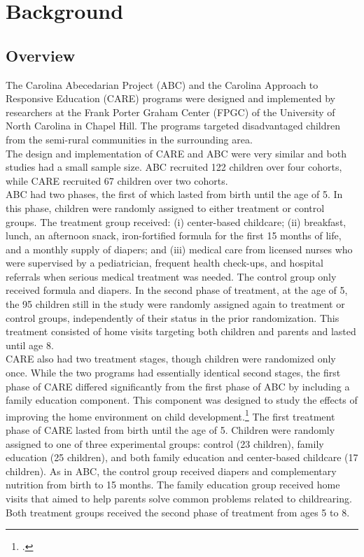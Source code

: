 \section{Background} \label{section:background}
\subsection{Overview}

\noindent The Carolina Abecedarian Project (ABC) and the Carolina Approach to Responsive Education (CARE) programs were designed and implemented by researchers at the Frank Porter Graham Center (FPGC) of the University of North Carolina in Chapel Hill. The programs targeted disadvantaged children from the semi-rural communities in the surrounding area.\\

\noindent The design and implementation of CARE and ABC were very similar and both studies had a small sample size. ABC recruited 122 children over four cohorts, while CARE recruited 67 children over two cohorts.\\  

\noindent ABC had two phases, the first of which lasted from birth until the age of 5. In this phase, children were randomly assigned to either treatment or control groups. The treatment group received: (i) center-based childcare; (ii) breakfast, lunch, an afternoon snack, iron-fortified formula for the first 15 months of life, and a monthly supply of diapers; and (iii) medical care from licensed nurses who were supervised by a pediatrician, frequent health check-ups, and hospital referrals when serious medical treatment was needed. The control group only received formula and diapers. In the second phase of treatment, at the age of 5, the 95 children still in the study were randomly assigned again to treatment or control groups, independently of their status in the prior randomization. This treatment consisted of home visits targeting both children and parents and lasted until age 8.\\ 

\noindent  CARE also had two treatment stages, though children were randomized only once. While the two programs had essentially identical second stages, the first phase of CARE differed significantly from the first phase of ABC by including a family education component. This component was designed to study the effects of improving the home environment on child development.\footnote{\citet{Wasik_Ramey_etal_1990_CD}.} The first treatment phase of CARE lasted from birth until the age of 5. Children were randomly assigned to one of three experimental groups: control (23 children), family education (25 children), and both family education and center-based childcare (17 children). As in ABC, the control group received diapers and complementary nutrition from birth to 15 months. The family education group received home visits that aimed to help parents solve common problems related to childrearing. Both treatment groups received the second phase of treatment from ages 5 to 8.\\


